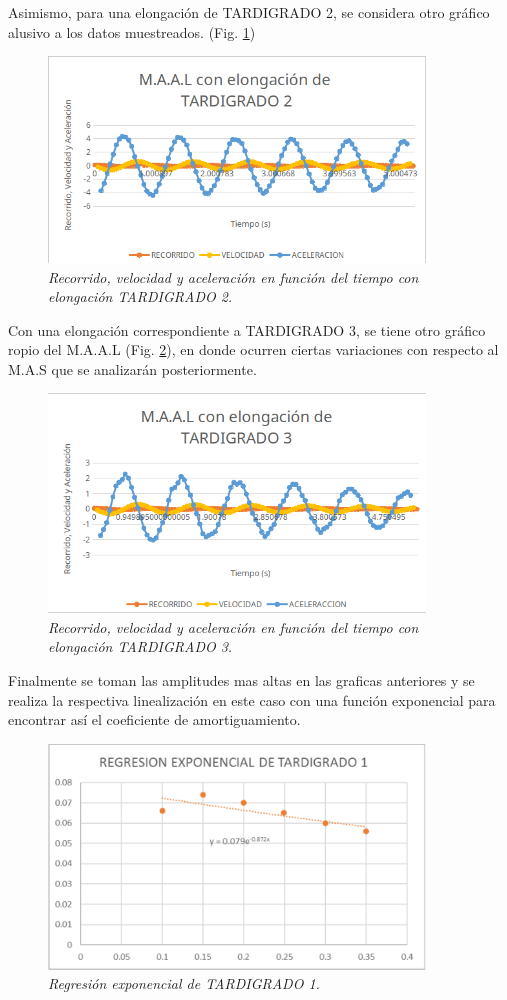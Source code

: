 \documentclass[spanish,notitlepage,letterpaper, 12pt]{article}
\begin{document}
\bigskip
Asimismo, para una elongación de TARDIGRADO 2, se considera otro gráfico alusivo a los datos muestreados. (Fig. \ref{Figura 5})
\begin{figure}[ht]
    \centering
    \includegraphics[width=10.0cm]{images/tardigrado2.png}
    \caption{\textit{Recorrido, velocidad y aceleración en función del tiempo con elongación TARDIGRADO 2.}}
    \label{Figura 5}
\end{figure}
\bigskip
Con una elongación correspondiente a TARDIGRADO 3, se tiene otro gráfico ropio del M.A.A.L (Fig. \ref{Figura 6}), en donde ocurren ciertas variaciones con respecto al M.A.S que se analizarán posteriormente.
\newpage
\begin{figure}[ht]
    \centering
    \includegraphics[width=10.0cm]{images/tardigrado3.png}
    \caption{\textit{Recorrido, velocidad y aceleración en función del tiempo con elongación TARDIGRADO 3.}}
    \label{Figura 6}
\end{figure}
Finalmente se toman las amplitudes mas altas en las graficas anteriores y se realiza la respectiva linealización en este caso con una función exponencial para encontrar así el coeficiente de amortiguamiento.
\begin{figure}[ht]
    \centering
    \includegraphics[width=10.0cm]{images/regresion-tardigrado1.png}
    \caption{\textit{Regresión exponencial de TARDIGRADO 1.}}
    \label{Figura 7}
\end{figure}
\end{document}
